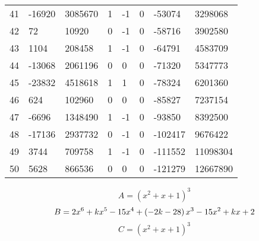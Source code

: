 \documentclass{amsart}
\begin{document}
\begin{longtable}{|l|l|l|lllll|}
41&-16920&3085670&1&-1&0&-53074&3298068\\
42&72&10920&0&-1&0&-58716&3902580\\
43&1104&208458&1&-1&0&-64791&4583709\\
44&-13068&2061196&0&0&0&-71320&5347773\\
45&-23832&4518618&1&1&0&-78324&6201360\\
46&624&102960&0&0&0&-85827&7237154\\
47&-6696&1348490&1&-1&0&-93850&8392500\\
48&-17136&2937732&0&-1&0&-102417&9676422\\
49&3744&709758&1&-1&0&-111552&11098304\\
50&5628&866536&0&0&0&-121279&12667890\\
\hline
\end{longtable}
$$A=(x^2
 + x
 + 1)^{3}$$
$$B=2\*x^6
 + k\*x^5
 - 15\*x^4
 + \left(-2\*k
 - 28\right) \*x^3
 - 15\*x^2
 + k\*x
 + 2$$
$$C=(x^2
 + x
 + 1)^{3}$$
\end{document}
